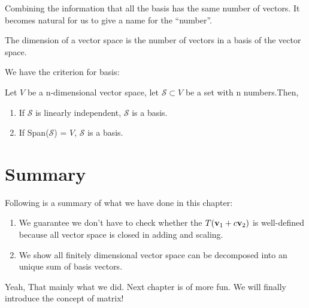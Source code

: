 Combining the information that all the basis has the same number of vectors. It becomes natural for us to give a name for the ``number''.
\begin{definition}
    The dimension of a vector space is the number of vectors in a basis of the vector space.
\end{definition}

We have the criterion for basis:
\begin{theorem}
    Let $V$ be a n-dimensional vector space, let $\mathcal{S}\subset V$ be a set with n numbers.Then,
    \begin{enumerate}
        \item If $\mathcal{S}$ is linearly independent, $\mathcal{S}$ is a basis.
        \item If Span($\mathcal{S}$) = $V$, $\mathcal{S}$ is a basis.
    \end{enumerate}
\end{theorem}

\section{Summary}
Following is a summary of what we have done in this chapter:
\begin{enumerate}
    \item We guarantee we don't have to check whether the $T(\mathbf{v}_1 + c\mathbf{v}_2)$ is well-defined because all vector space is closed in adding and scaling.
    \item We show all finitely dimensional vector space can be decomposed into an unique sum of basis vectors.
\end{enumerate}
Yeah, That mainly what we did. Next chapter is of more fun. We will finally introduce the concept of matrix!
